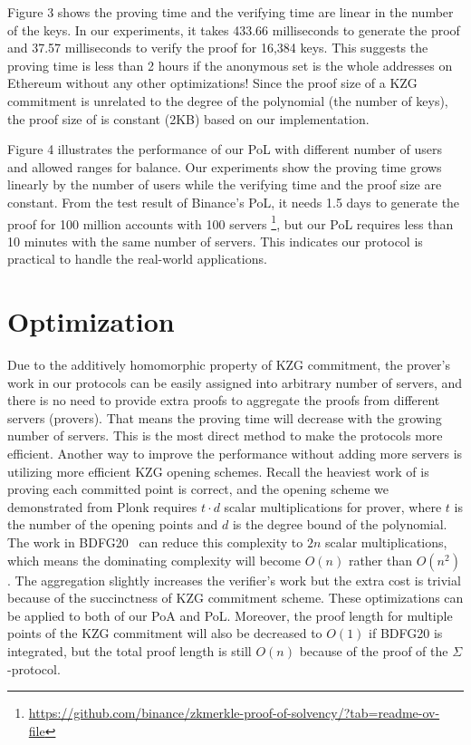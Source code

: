 Figure 3 shows the proving time and the verifying time are linear in the number of the keys. In our experiments, it takes 433.66 milliseconds to generate the proof and 37.57 milliseconds to verify the proof for 16,384 keys. This suggests the proving time is less than 2 hours if the anonymous set is the whole addresses on Ethereum without any other optimizations! Since the proof size of a KZG commitment is unrelated to the degree of the polynomial (the number of keys), the proof size of \poa is constant (2KB) based on our implementation.

Figure 4 illustrates the performance of our PoL with different number of users and allowed ranges for balance. Our experiments show the proving time grows linearly by the number of users while the verifying time and the proof size are constant. From the test result of Binance's PoL, it needs 1.5 days to generate the proof for 100 million accounts with 100 servers \footnote{\url{https://github.com/binance/zkmerkle-proof-of-solvency/?tab=readme-ov-file}}, but our PoL requires less than 10 minutes with the same number of servers. This indicates our protocol is practical to handle the real-world applications.

\section{Optimization}
\label{sec:opt}
Due to the additively homomorphic property of KZG commitment, the prover's work in our protocols can be easily assigned into arbitrary number of servers, and there is no need to provide extra proofs to aggregate the proofs from different servers (provers). That means the proving time will decrease with the growing number of servers. This is the most direct method to make the protocols more efficient. Another way to improve the performance without adding more servers is utilizing more efficient KZG opening schemes. Recall the heaviest work of \bootstrap is proving each committed point is correct, and the opening scheme we demonstrated from Plonk requires $t\cdot{d}$ scalar multiplications for prover, where $t$ is the number of the opening points and $d$ is the degree bound of the polynomial. The work in BDFG20~\cite{bdfg} can reduce this complexity to $2n$ scalar multiplications, which means the dominating complexity will become $O(n)$ rather than $O(n^2)$. The aggregation slightly increases the verifier's work but the extra cost is trivial because of the succinctness of KZG commitment scheme. These optimizations can be applied to both of our PoA and PoL. Moreover, the proof length for multiple points of the KZG commitment will also be decreased to $O(1)$ if BDFG20 is integrated, but the total proof length is still $O(n)$ because of the proof of the $\Sigma$-protocol.

